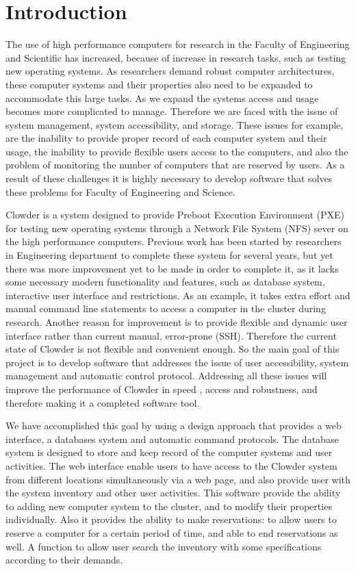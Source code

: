 \chapter{Introduction}
\label{chap:intro}

The use of high performance computers for  research in the Faculty of Engineering  and Scientific has increased, because of increase in research tasks, such as testing new operating systems. As researchers demand robust computer architectures, these computer systems and their properties  also need to be expanded to accommodate this large tasks. As we expand the systems access and usage  becomes more complicated to manage. Therefore we are faced with the issue of system management, system accessibility, and storage. These issues for example, are the inability to provide proper record of each computer system and their usage, the inability to provide flexible users access to the computers, and also the problem of monitoring the number of computers that are reserved by users. As a result of these challenges it is highly necessary to develop software that solves these problems for Faculty of Engineering and Science. 


Clowder is a system designed to provide Preboot Execution Environment (PXE) for testing new operating systems through a Network File System (NFS) sever on the high performance computers. Previous work has been started by researchers in Engineering department to complete these system for several years, but yet there was more improvement yet to be made in order to complete it, as it lacks some necessary modern functionality and features, such as database system, interactive user interface  and restrictions.  As an example, it takes extra effort and manual command line statements to access  a computer in the cluster during research. Another reason for improvement is to provide flexible and dynamic user interface rather than current manual, error-prone (SSH). Therefore the current state of Clowder is not flexible and convenient enough. So the main goal of this project is to develop software that addresses the issue of user accessibility, system management and automatic control protocol. Addressing all these issues will improve the performance of Clowder in speed , access and robustness, and therefore making it a completed software tool. 
	
	
We have accomplished this goal by using a design approach that provides a web interface, a databases system and automatic command protocols. The database system is designed to store and keep record of the computer systems and user activities. The web interface enable users to have access to the Clowder system from different locations simultaneously via a web page, and also provide user with the system inventory and other user activities. This  software provide the ability to adding new computer system to the cluster, and to modify their properties individually. Also it provides the ability to make reservations: to allow users to reserve a computer for a certain period of time, and able to end reservations as well. A function to allow user search the inventory with some specifications according to their demands.   
	

